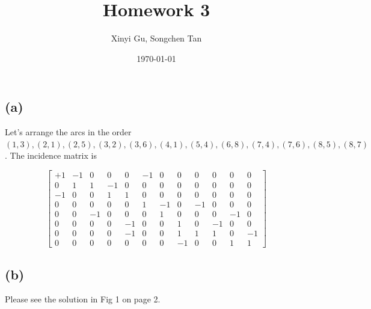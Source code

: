 \documentclass{article}
\title{Homework 3}
\author{Xinyi Gu, Songchen Tan}
\date{\today}
\newcommand{\1}{\bm 1}
\begin{document}
\maketitle
\section{}

\subsection*{(a)}
Let's arrange the arcs in the order $(1, 3), (2, 1), (2, 5), (3, 2), (3, 6), (4, 1), (5, 4), (6, 8), (7, 4), (7, 6), (8, 5), (8, 7)$. The incidence matrix is

$$
\begin{bmatrix}
+1&-1&0&0&0&-1&0&0&0&0&0&0\\
0&1&1&-1& 0&0&0&0& 0&0&0&0\\
-1&0&0&1& 1&0&0&0& 0&0&0&0\\
0&0&0&0& 0&1&-1&0& -1&0&0&0\\
0&0&-1&0& 0&0&1&0& 0&0&-1&0\\
0&0&0&0& -1&0&0&1& 0&-1&0&0\\
0&0&0&0& -1&0&0&1& 1&1&0&-1\\
0&0&0&0& 0&0&0&-1& 0&0&1&1
\end{bmatrix}
$$

\subsection*{(b)}

Please see the solution in Fig 1 on page 2.
\end{document}
